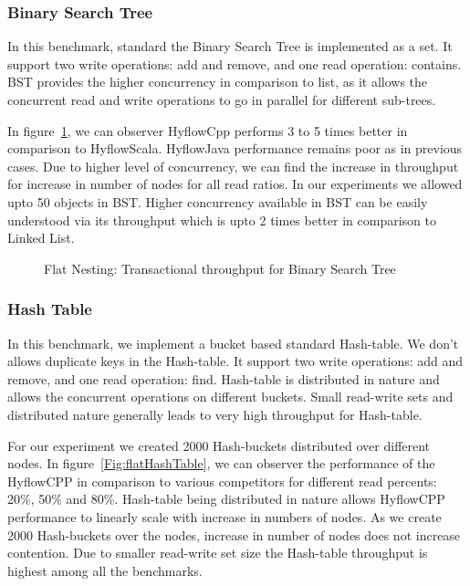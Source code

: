 \documentclass[12pt,english]{report}
\begin{document}
\subsubsection{Binary Search Tree}
In this benchmark, standard the Binary Search Tree is implemented as a set. It support two write operations: add and remove, and one read operation: contains. BST provides the higher concurrency in comparison to list, as it allows the concurrent read and write operations to go in parallel for different sub-trees. 

In figure~\ref{Fig:flatBst}, we can observer HyflowCpp performs 3 to 5 times better in comparison to HyflowScala. HyflowJava performance remains poor as in previous cases. Due to higher level of concurrency, we can find the increase in throughput for increase in number of nodes for all read ratios. In our experiments we allowed upto 50 objects in BST. Higher concurrency available in BST can be easily understood via its throughput which is upto 2 times better in comparison to Linked List.

\begin{figure}[H]
\centering
{}
\end{figure}
\begin{figure}[H]
\centering
{}
\end{figure}
\begin{figure}[H]
\centering
{}
\caption{Flat Nesting: Transactional throughput for Binary Search Tree}
\label{Fig:flatBst}
\end{figure}

\subsubsection{Hash Table}
In this benchmark, we implement a bucket based standard Hash-table. We don't allows duplicate keys in the Hash-table. It support two write operations: add and remove, and one read operation: find. Hash-table is distributed in nature and allows the concurrent operations on different buckets. Small read-write sets and distributed nature generally leads to very high throughput for Hash-table.

For our experiment we created 2000 Hash-buckets distributed over different nodes. In figure~\ref{Fig:flatHashTable}, we can observer the performance of the HyflowCPP in comparison to various competitors for different read percents: 20\%, 50\% and 80\%. Hash-table being distributed in nature allows HyflowCPP performance to linearly scale with increase in numbers of nodes. As we create 2000 Hash-buckets over the nodes, increase in number of nodes does not increase contention. Due to smaller read-write set size the Hash-table throughput is highest among all the benchmarks.
\end{document}
